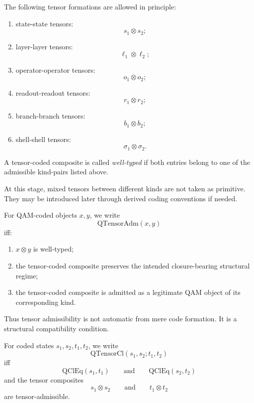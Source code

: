 \begin{definition}
The following tensor formations are allowed in principle:
\begin{enumerate}
\item state-state tensors:
\[
s_1\otimes s_2;
\]
\item layer-layer tensors:
\[
\ell_1\otimes \ell_2;
\]
\item operator-operator tensors:
\[
o_1\otimes o_2;
\]
\item readout-readout tensors:
\[
r_1\otimes r_2;
\]
\item branch-branch tensors:
\[
b_1\otimes b_2;
\]
\item shell-shell tensors:
\[
\sigma_1\otimes \sigma_2.
\]
\end{enumerate}
A tensor-coded composite is called \emph{well-typed} if both entries belong to one of the admissible kind-pairs listed above.
\end{definition}

\begin{remark}
At this stage, mixed tensors between different kinds are not taken as primitive. They may be introduced later through derived coding conventions if needed.
\end{remark}

\begin{definition}
For QAM-coded objects $x,y$, we write
\[
\mathrm{QTensorAdm}(x,y)
\]
iff:
\begin{enumerate}
\item $x\otimes y$ is well-typed;
\item the tensor-coded composite preserves the intended closure-bearing structural regime;
\item the tensor-coded composite is admitted as a legitimate QAM object of its corresponding kind.
\end{enumerate}
\end{definition}

\begin{remark}
Thus tensor admissibility is not automatic from mere code formation. It is a structural compatibility condition.
\end{remark}

\begin{definition}
For coded states $s_1,s_2,t_1,t_2$, we write
\[
\mathrm{QTensorCl}(s_1,s_2;t_1,t_2)
\]
iff
\[
\mathrm{QClEq}(s_1,t_1)
\qquad\text{and}\qquad
\mathrm{QClEq}(s_2,t_2)
\]
and the tensor composites
\[
s_1\otimes s_2
\qquad\text{and}\qquad
t_1\otimes t_2
\]
are tensor-admissible.
\end{definition}

